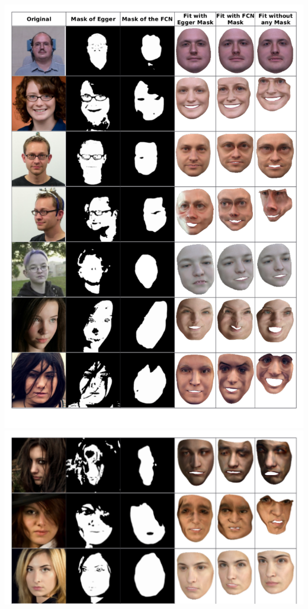 \includegraphics[width=1\textwidth]{Figures/appendix/Real-Life/Real-Life_1.pdf}
\label{appendix:real-world data}
\includegraphics[width=1\textwidth]{Figures/appendix/Real-Life/Real-Life_2.pdf}


